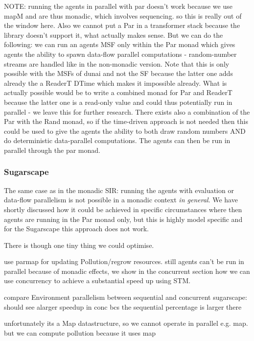 NOTE: running the agents in parallel with par doesn't work because we use mapM and are thus monadic, which involves sequencing. so this is really out of the window here. Also we cannot put a Par in a transformer stack because the library doesn't support it, what actually makes sense. But we can do the following: we can run an agents MSF only within the Par monad which gives agents the ability to spawn data-flow parallel computations - random-number streams are handled like in the non-monadic version. Note that this is only possible with the MSFs of dunai and not the SF because the latter one adds already the a ReaderT DTime which makes it impossible already. 
What is actually possible would be to write a combined monad for Par and ReaderT because the latter one is a read-only value and could thus potentially run in parallel - we leave this for further research. There exists also a combination of the Par with the Rand monad, so if the time-driven approach is not needed then this could be used to give the agents the ability to both draw random numbers AND do deterministic data-parallel computations. The agents can then be run in parallel through the par monad.


\subsubsection{Sugarscape}
The same case as in the monadic SIR: running the agents with evaluation or data-flow parallelism is not possible in a monadic context  \textit{in general}. We have shortly discussed how it could be achieved in specific circumstances where then agents are running in the Par monad only, but this is highly model specific and for the Sugarscape this approach does not work. 

There is though one tiny thing we could optimise.

use parmap for updating Pollution/regrow resources. still agents can't be run in parallel because of monadic effects, we show in the concurrent section how we can use concurrency to achieve a substantial speed up using STM.

compare Environment parallelism between sequential and concurrent sugarscape: should see alarger speedup in conc bcs the sequential percentage is larger there

unfortunately its a Map datastructure, so we cannot operate in parallel e.g. map. but we can compute pollution because it uses map



